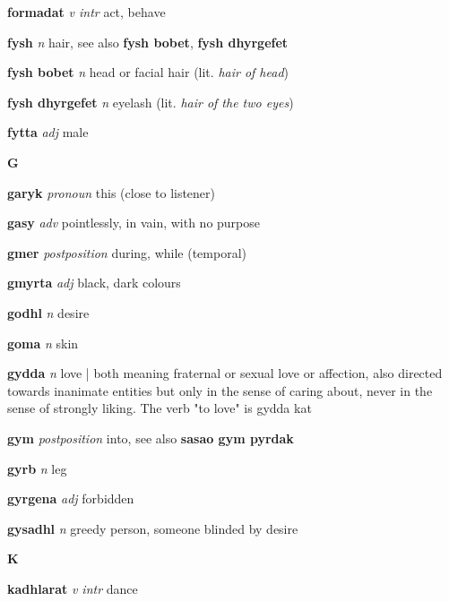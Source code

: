 \textbf{formadat}   \emph{v intr} \textperiodcentered act, behave

\textbf{fysh}   \emph{n} \textperiodcentered hair, see also \textbf{fysh bobet}, \textbf{fysh dhyrgefet}

\textbf{fysh bobet}   \emph{n} \textperiodcentered head or facial hair (lit. \emph{hair of head})

\textbf{fysh dhyrgefet}   \emph{n} \textperiodcentered eyelash (lit. \emph{hair of the two eyes})

\textbf{fytta}   \emph{adj} \textperiodcentered male

\begin{center} \Huge \bfseries G \end{center}\textbf{garyk}   \emph{pronoun} \textperiodcentered this (close to listener)

\textbf{gasy}   \emph{adv} \textperiodcentered pointlessly, in vain, with no purpose

\textbf{gmer}   \emph{postposition} \textperiodcentered during, while (temporal)

\textbf{gmyrta}   \emph{adj} \textperiodcentered black, dark colours

\textbf{godhl}   \emph{n} \textperiodcentered desire

\textbf{goma}   \emph{n} \textperiodcentered skin

\textbf{gydda}   \emph{n} \textperiodcentered love | both meaning fraternal or sexual love or affection, also directed towards inanimate entities but only in the sense of caring about, never in the sense of strongly liking. The verb "to love" is gydda kat

\textbf{gym}   \emph{postposition} \textperiodcentered into, see also \textbf{sasao gym pyrdak}

\textbf{gyrb}   \emph{n} \textperiodcentered leg

\textbf{gyrgena}   \emph{adj} \textperiodcentered forbidden

\textbf{gysadhl}   \emph{n} \textperiodcentered greedy person, someone blinded by desire

\begin{center} \Huge \bfseries K \end{center}\textbf{kadhlarat}   \emph{v intr} \textperiodcentered dance


